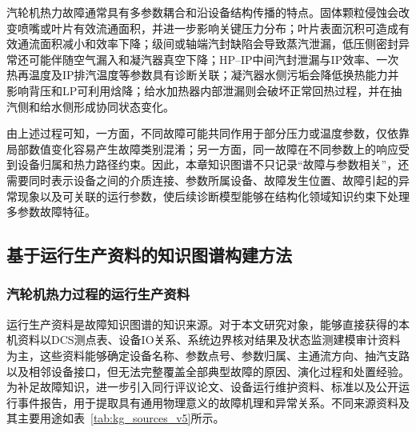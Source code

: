 汽轮机热力故障通常具有多参数耦合和沿设备结构传播的特点。固体颗粒侵蚀会改变喷嘴或叶片有效流通面积，并进一步影响关键压力分布\cite{Kubiak2002TurbineDegradation}；叶片表面沉积可造成有效通流面积减小和效率下降\cite{Kubiak2002ScaleDeposit}；级间或轴端汽封缺陷会导致蒸汽泄漏，低压侧密封异常还可能伴随空气漏入和凝汽器真空下降\cite{ZhangHu2021FaultPropagationGNN}；HP--IP中间汽封泄漏与IP效率、一次热再温度及IP排汽温度等参数具有诊断关联\cite{Xu2011HPIPLeakage}；凝汽器水侧污垢会降低换热能力并影响背压和LP可利用焓降\cite{Li2016CondenserFouling,Medica2018CondenserCondition}；给水加热器内部泄漏则会破坏正常回热过程，并在抽汽侧和给水侧形成协同状态变化\cite{Heo2012FWHLeakage,Barszcz2011FeedwaterHeater}。

由上述过程可知，一方面，不同故障可能共同作用于部分压力或温度参数，仅依靠局部数值变化容易产生故障类别混淆；另一方面，同一故障在不同参数上的响应受到设备归属和热力路径约束。因此，本章知识图谱不只记录“故障与参数相关”，还需要同时表示设备之间的介质连接、参数所属设备、故障发生位置、故障引起的异常现象以及可关联的运行参数，使后续诊断模型能够在结构化领域知识约束下处理多参数故障特征。

\subsection{基于运行生产资料的知识图谱构建方法}
\label{subsec:kg_construction_v5}

\subsubsection{汽轮机热力过程的运行生产资料}
\label{subsubsec:operation_materials_v5}

运行生产资料是故障知识图谱的知识来源。对于本文研究对象，能够直接获得的本机资料以DCS测点表、设备IO关系、系统边界核对结果及状态监测建模审计资料为主，这些资料能够确定设备名称、参数点号、参数归属、主通流方向、抽汽支路以及相邻设备接口，但无法完整覆盖全部典型故障的原因、演化过程和处置经验。为补足故障知识，进一步引入同行评议论文、设备运行维护资料、标准以及公开运行事件报告，用于提取具有通用物理意义的故障机理和异常关系。不同来源资料及其主要用途如表~\ref{tab:kg_sources_v5}所示。

